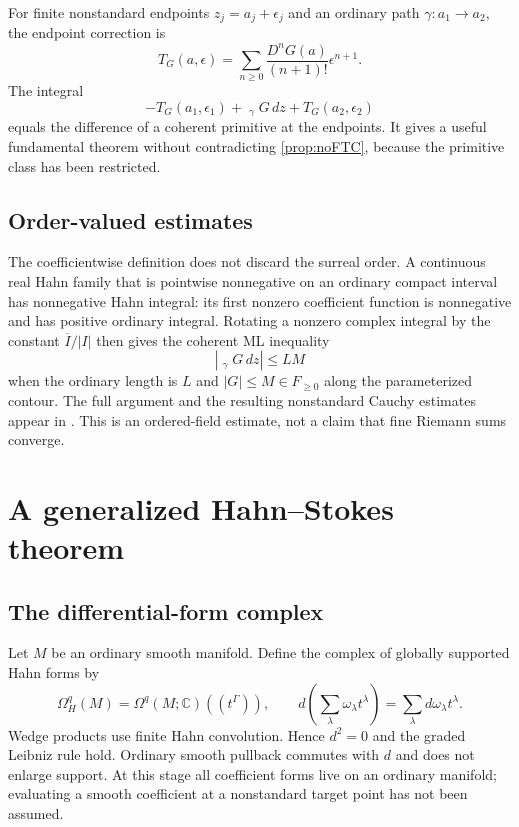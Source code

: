 \documentclass[11pt,letterpaper]{article}
\theoremstyle{definition}
\theoremstyle{remark}
\newcommand{\C}{\mathbb C}
\newcommand{\HInt}{\mathop{\int^{\!H}}\nolimits}
\numberwithin{equation}{section}
\begin{document}
For finite nonstandard endpoints $z_j=a_j+\epsilon_j$ and an ordinary path $\gamma:a_1\to a_2$, the endpoint correction is
\[
T_G(a,\epsilon)=\sum_{n\ge0}\frac{D^nG(a)}{(n+1)!}\epsilon^{n+1}.
\]
The integral
\begin{equation}\label{eq:endpoint}
-T_G(a_1,\epsilon_1)+\HInt_\gamma G\,dz+T_G(a_2,\epsilon_2)
\end{equation}
equals the difference of a coherent primitive at the endpoints. It gives a useful fundamental theorem without contradicting \cref{prop:noFTC}, because the primitive class has been restricted.

\subsection{Order-valued estimates}
The coefficientwise definition does not discard the surreal order. A continuous real Hahn family that is pointwise nonnegative on an ordinary compact interval has nonnegative Hahn integral: its first nonzero coefficient function is nonnegative and has positive ordinary integral. Rotating a nonzero complex integral by the constant $\overline I/|I|$ then gives the coherent ML inequality
\[
\left|\HInt_\gamma G\,dz\right|\le L M
\]
when the ordinary length is $L$ and $|G|\le M\in F_{\ge0}$ along the parameterized contour. The full argument and the resulting nonstandard Cauchy estimates appear in \cite{SA}. This is an ordered-field estimate, not a claim that fine Riemann sums converge.

\section{A generalized Hahn--Stokes theorem}\label{sec:Stokes}
\subsection{The differential-form complex}
Let $M$ be an ordinary smooth manifold. Define the complex of globally supported Hahn forms by
\begin{equation}\label{eq:Hforms}
\Omega_H^q(M)=\Omega^q(M;\C)((t^\Gamma)),\qquad
 d\left(\sum_\lambda\omega_\lambda t^\lambda\right)
 =\sum_\lambda d\omega_\lambda t^\lambda.
\end{equation}
Wedge products use finite Hahn convolution. Hence $d^2=0$ and the graded Leibniz rule hold. Ordinary smooth pullback commutes with $d$ and does not enlarge support. At this stage all coefficient forms live on an ordinary manifold; evaluating a smooth coefficient at a nonstandard target point has not been assumed.
\end{document}
